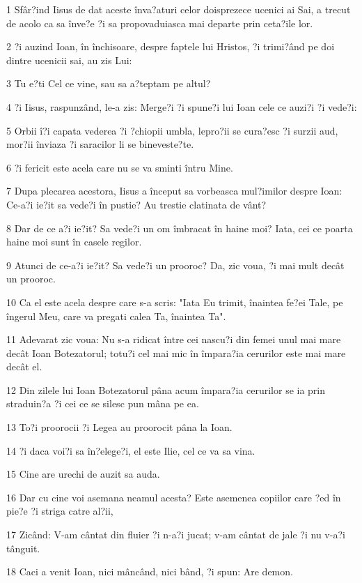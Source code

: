 \par 1 Sfâr?ind Iisus de dat aceste înva?aturi celor doisprezece ucenici ai Sai, a trecut de acolo ca sa înve?e ?i sa propovaduiasca mai departe prin ceta?ile lor.
\par 2 ?i auzind Ioan, în închisoare, despre faptele lui Hristos, ?i trimi?ând pe doi dintre ucenicii sai, au zis Lui:
\par 3 Tu e?ti Cel ce vine, sau sa a?teptam pe altul?
\par 4 ?i Iisus, raspunzând, le-a zis: Merge?i ?i spune?i lui Ioan cele ce auzi?i ?i vede?i:
\par 5 Orbii î?i capata vederea ?i ?chiopii umbla, lepro?ii se cura?esc ?i surzii aud, mor?ii înviaza ?i saracilor li se bineveste?te.
\par 6 ?i fericit este acela care nu se va sminti întru Mine.
\par 7 Dupa plecarea acestora, Iisus a început sa vorbeasca mul?imilor despre Ioan: Ce-a?i ie?it sa vede?i în pustie? Au trestie clatinata de vânt?
\par 8 Dar de ce a?i ie?it? Sa vede?i un om îmbracat în haine moi? Iata, cei ce poarta haine moi sunt în casele regilor.
\par 9 Atunci de ce-a?i ie?it? Sa vede?i un prooroc? Da, zic voua, ?i mai mult decât un prooroc.
\par 10 Ca el este acela despre care s-a scris: "Iata Eu trimit, înaintea fe?ei Tale, pe îngerul Meu, care va pregati calea Ta, înaintea Ta".
\par 11 Adevarat zic voua: Nu s-a ridicat între cei nascu?i din femei unul mai mare decât Ioan Botezatorul; totu?i cel mai mic în împara?ia cerurilor este mai mare decât el.
\par 12 Din zilele lui Ioan Botezatorul pâna acum împara?ia cerurilor se ia prin straduin?a ?i cei ce se silesc pun mâna pe ea.
\par 13 To?i proorocii ?i Legea au proorocit pâna la Ioan.
\par 14 ?i daca voi?i sa în?elege?i, el este Ilie, cel ce va sa vina.
\par 15 Cine are urechi de auzit sa auda.
\par 16 Dar cu cine voi asemana neamul acesta? Este asemenea copiilor care ?ed în pie?e ?i striga catre al?ii,
\par 17 Zicând: V-am cântat din fluier ?i n-a?i jucat; v-am cântat de jale ?i nu v-a?i tânguit.
\par 18 Caci a venit Ioan, nici mâncând, nici bând, ?i spun: Are demon.
